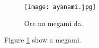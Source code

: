 \documentclass{article}
\begin{document}
\begin{figure}
	\texttt{[image: ayanami.jpg]}
	\caption{Ore no megami da.}
	\label{fig:ayanami1}
\end{figure}

Figure \ref{fig:ayanami1} show a megami.
\end{document}
